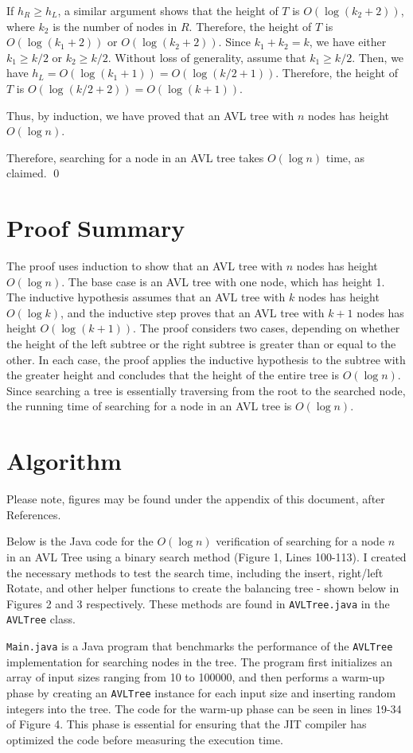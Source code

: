 \documentclass[12pt]{article}
\begin{document}
If $h_R \geq h_L$, a similar argument shows that the height of $T$ is $O(\log(k_2+2))$, where $k_2$ is the number of nodes in $R$. Therefore, the height of $T$ is $O(\log(k_1+2))$ or $O(\log(k_2+2))$. Since $k_1+k_2 = k$, we have either $k_1\geq k/2$ or $k_2\geq k/2$. Without loss of generality, assume that $k_1\geq k/2$. Then, we have $h_L = O(\log(k_1+1)) = O(\log(k/2+1))$. Therefore, the height of $T$ is $O(\log(k/2+2)) = O(\log(k+1))$.

Thus, by induction, we have proved that an AVL tree with $n$ nodes has height $O(\log n)$.

Therefore, searching for a node in an AVL tree takes $O(\log n)$ time, as claimed. \qed

\section*{Proof Summary}
The proof uses induction to show that an AVL tree with $n$ nodes has height $O(\log n)$. The base case is an AVL tree with one node, which has height 1. The inductive hypothesis assumes that an AVL tree with $k$ nodes has height $O(\log k)$, and the inductive step proves that an AVL tree with $k+1$ nodes has height $O(\log(k+1))$. The proof considers two cases, depending on whether the height of the left subtree or the right subtree is greater than or equal to the other. In each case, the proof applies the inductive hypothesis to the subtree with the greater height and concludes that the height of the entire tree is $O(\log n)$. Since searching a tree is essentially traversing from the root to the searched node, the running time of searching for a node in an AVL tree is $O(\log n)$.

\section*{Algorithm}

Please note, figures may be found under the appendix of this document, after References.

Below is the Java code for the $O(\log n)$ verification of searching for a node $n$ in an AVL Tree using a binary search method (Figure 1, Lines 100-113). I created the necessary methods to test the search time, including the insert, right/left Rotate, and other helper functions to create the balancing tree - shown below in Figures 2 and 3 respectively. These methods are found in \texttt{AVLTree.java} in the \texttt{AVLTree} class.

\texttt{Main.java} is a Java program that benchmarks the performance of the \texttt{AVLTree} implementation for searching nodes in the tree. The program first initializes an array of input sizes ranging from 10 to 100000, and then performs a warm-up phase by creating an \texttt{AVLTree} instance for each input size and inserting random integers into the tree. The code for the warm-up phase can be seen in lines 19-34 of Figure 4. This phase is essential for ensuring that the JIT compiler has optimized the code before measuring the execution time.
\end{document}
